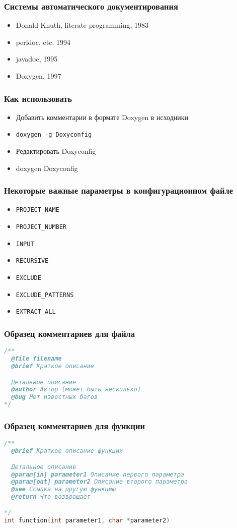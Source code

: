 \begin{frame}
 \frametitle{Системы автоматического документирования}
 \begin{itemize}
  \item Donald Knuth, literate programming, 1983
  \item perldoc, etc. 1994
  \item javadoc, 1995
  \item Doxygen, 1997
 \end{itemize}
\end{frame}

\begin{frame}
 \frametitle{Как использовать}
 \begin{itemize}
  \item Добавить комментарии в формате Doxygen в исходники
  \item \texttt{doxygen -g Doxyconfig}
  \item Редактировать Doxyconfig
  \item doxygen Doxyconfig
 \end{itemize}
\end{frame}

\begin{frame}[fragile]
 \frametitle{Некоторые важные параметры в конфигурационном файле}
 \begin{itemize}
  \item \verb+PROJECT_NAME+
  \item \verb+PROJECT_NUMBER+
  \item \verb+INPUT+  
  \item \verb+RECURSIVE+
  \item \verb+EXCLUDE+
  \item \verb+EXCLUDE_PATTERNS+
  \item \verb+EXTRACT_ALL+
 \end{itemize}
\end{frame}

\begin{frame}[fragile]
 \frametitle{Образец комментариев для файла}
\begin{lstlisting}[language=C]
/**
  @file filename
  @brief Краткое описание

  Детальное описание
  @author Автор (может быть несколько)
  @bug Нет известных багов
*/
\end{lstlisting}
\end{frame}

\begin{frame}[fragile]
 \frametitle{Образец комментариев для функции}
\begin{lstlisting}[language=C]
/**
  @brief Краткое описание функции

  Детальное описание
  @param[in] parameter1 Описание первого параметра
  @param[out] parameter2 Описание второго параметра
  @see Ссылка на другую функцию
  @return Что возвращает

*/
int function(int parameter1, char *parameter2) 
\end{lstlisting}
\end{frame}

